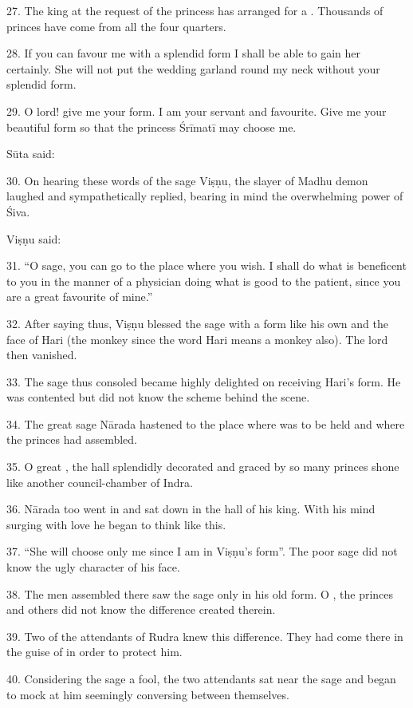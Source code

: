 27. The king at the request of the princess has arranged for a .
Thousands of princes have come from all the four quarters.

28. If you can favour me with a splendid form I shall be able to gain her
certainly. She will not put the wedding garland round my neck without your
splendid form.

29. O lord! give me your form. I am your servant and favourite. Give me your
beautiful form so that the princess Śrīmatī may choose me.

Sūta said:

30. On hearing these words of the sage Viṣṇu, the slayer of Madhu demon laughed
and sympathetically replied, bearing in mind the overwhelming power of Śiva.

Viṣṇu said:

31. “O sage, you can go to the place where you wish. I shall do what is
beneficent to you in the manner of a physician doing what is good to the patient,
since you are a great favourite of mine.”

32. After saying thus, Viṣṇu blessed the sage with a form like his own and
the face of Hari (\ie the monkey since the word Hari means a monkey also).
The lord then vanished.

33. The sage thus consoled became highly delighted on receiving Hari’s form.
He was contented but did not know the scheme behind the scene.

34. The great sage Nārada hastened to the place where  was to be
held and where the princes had assembled.

35. O great , the  hall splendidly decorated and
graced by so many princes shone like another council-chamber of Indra.

36. Nārada too went in and sat down in the hall of his king. With his mind
surging with love he began to think like this.

37. “She will choose only me since I am in Viṣṇu’s form”. The poor sage did not
know the ugly character of his face.

38. The men assembled there saw the sage only in his old form. O ,
the princes and others did not know the difference created therein.

39. Two of the attendants of Rudra knew this difference. They had come there in
the guise of  in order to protect him.

40. Considering the sage a fool, the two attendants sat near the sage and began
to mock at him seemingly conversing between themselves.

